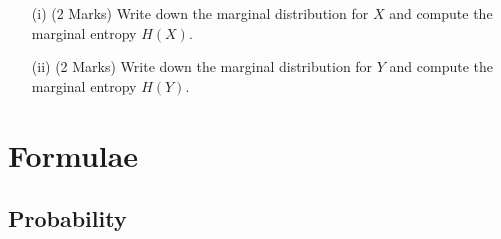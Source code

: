 \documentclass[a4paper,12pt]{article}
\begin{document}
\begin{itemize}
\begin{itemize}
\begin{itemize}
\item[(i)] (2 Marks) Write down the marginal distribution for $X$ and compute the marginal entropy $H(X)$.
\item[(ii)] (2 Marks) Write down the marginal distribution for $Y$ and compute the marginal entropy $H(Y )$.
\end{itemize}

\end{itemize}
\newpage










\newpage
\section*{Formulae}
\subsection*{Probability}
\begin{itemize}


\end{itemize}
\end{itemize}
\end{document}
